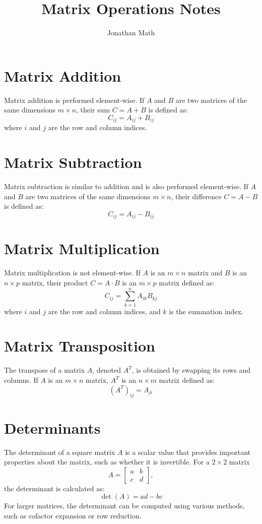 \documentclass{article}
\title{\vspace{-2cm}Matrix Operations Notes}
\author{Jonathan Math}
\date{}
\begin{document}
\maketitle

\section{Matrix Addition}
Matrix addition is performed element-wise. If \( A \) and \( B \) are two matrices of the same dimensions \( m \times n \), their sum \( C = A + B \) is defined as:
\[
C_{ij} = A_{ij} + B_{ij}
\]
where \( i \) and \( j \) are the row and column indices.

\section{Matrix Subtraction}
Matrix subtraction is similar to addition and is also performed element-wise. If \( A \) and \( B \) are two matrices of the same dimensions \( m \times n \), their difference \( C = A - B \) is defined as:
\[
C_{ij} = A_{ij} - B_{ij}
\]

\section{Matrix Multiplication}
Matrix multiplication is not element-wise. If \( A \) is an \( m \times n \) matrix and \( B \) is an \( n \times p \) matrix, their product \( C = A \cdot B \) is an \( m \times p \) matrix defined as:
\[
C_{ij} = \sum_{k=1}^{n} A_{ik} B_{kj}
\]
where \( i \) and \( j \) are the row and column indices, and \( k \) is the summation index.

\section{Matrix Transposition}
The transpose of a matrix \( A \), denoted \( A^T \), is obtained by swapping its rows and columns. If \( A \) is an \( m \times n \) matrix, \( A^T \) is an \( n \times m \) matrix defined as:
\[
(A^T)_{ij} = A_{ji}
\]

\section{Determinants}
The determinant of a square matrix \( A \) is a scalar value that provides important properties about the matrix, such as whether it is invertible. For a \( 2 \times 2 \) matrix 
\[
A = \begin{bmatrix}
a & b \\
c & d
\end{bmatrix},
\]
the determinant is calculated as:
\[
\det(A) = ad - bc
\]
For larger matrices, the determinant can be computed using various methods, such as cofactor expansion or row reduction.
\end{document}
